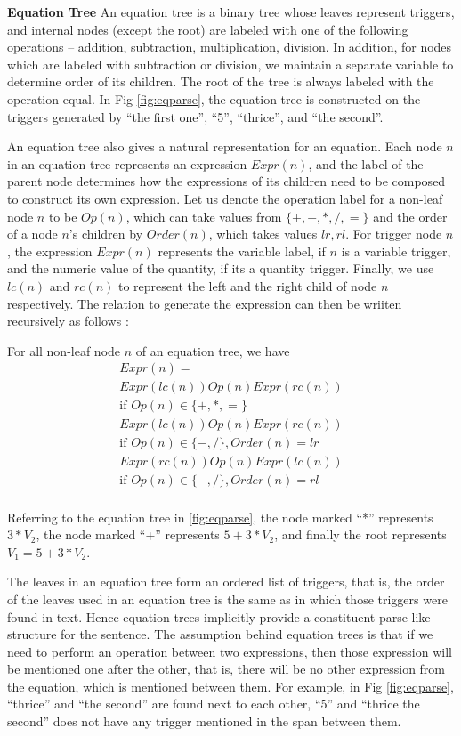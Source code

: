   \noindent \textbf{Equation Tree} An equation tree is a binary tree
  whose leaves represent triggers, and internal nodes (except the
  root) are labeled with one of the following operations -- addition,
  subtraction, multiplication, division. In addition, for nodes which
  are labeled with subtraction or division, we maintain a separate
  variable to determine order of its children. The root of the tree is
  always labeled with the operation equal. In Fig \ref{fig:eqparse},
  the equation tree is constructed on the triggers generated by ``the
  first one'', ``5'', ``thrice'', and ``the second''. 

  An equation tree also gives a natural representation for an
  equation. Each node $n$ in an equation tree represents an expression
  $Expr(n)$, and the label of the parent node determines how the
  expressions of its children need to be composed to construct its own
  expression. Let us denote the operation label for a non-leaf node
  $n$ to be $Op(n)$, which can take values from $\{+, -, *, /, =\}$
  and the order of a node $n$'s children by $Order(n)$, which takes
  values ${lr, rl}$. For trigger node $n$, the expression $Expr(n)$
  represents the variable label, if $n$ is a variable trigger, and the
  numeric value of the quantity, if its a quantity trigger. Finally,
  we use $lc(n)$ and $rc(n)$ to represent the left and the right child
  of node $n$ respectively. The relation to generate the expression
  can then be wriiten recursively as follows :
  
  For all non-leaf node $n$ of an equation tree, we have
  \begin{multline}
    Expr(n) = \\
    Expr(lc(n)) Op(n) Expr(rc(n)) \\
    \mbox{if } Op(n) \in \{+,*, =\} \\
    Expr(lc(n)) Op(n) Expr(rc(n)) \\
    \mbox{if } Op(n) \in \{-,/\}, Order(n)=lr \\
    Expr(rc(n)) Op(n) Expr(lc(n)) \\
    \mbox{if } Op(n) \in \{-,/\}, Order(n)=rl \\
  \end{multline}

  Referring to the equation tree in \ref{fig:eqparse}, the node marked
  ``*'' represents $3*V_2$, the node marked ``+'' represents
  $5+3*V_2$, and finally the root represents $V_1=5+3*V_2$.
  
  The leaves in an equation tree form an ordered list of triggers,
  that is, the order of the leaves used in an equation tree is the
  same as in which those triggers were found in text. Hence equation
  trees implicitly provide a constituent parse like structure for the
  sentence. The assumption behind equation trees is that if we need to
  perform an operation between two expressions, then those expression
  will be mentioned one after the other, that is, there will be no
  other expression from the equation, which is mentioned between
  them. For example, in Fig \ref{fig:eqparse}, ``thrice'' and ``the
  second'' are found next to each other, ``5'' and ``thrice the
  second'' does not have any trigger mentioned in the span between
  them. 

